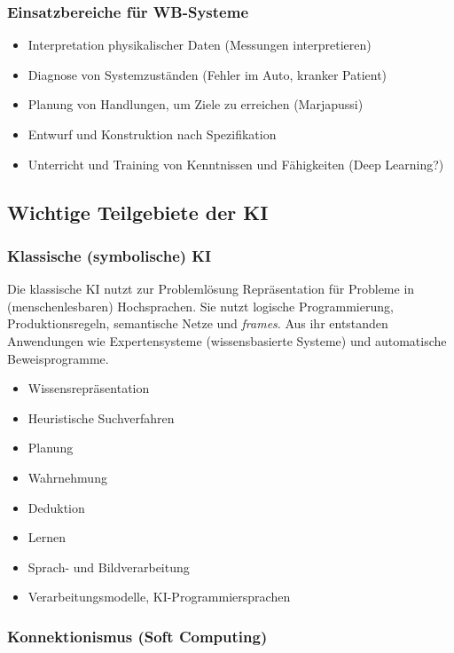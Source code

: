 \documentclass[runningheads,deutsch]{llncs}
\begin{document}
\subsubsection{Einsatzbereiche für WB-Systeme}
\begin{itemize}
    \item Interpretation physikalischer Daten (Messungen interpretieren)
    \item Diagnose von Systemzuständen (Fehler im Auto, kranker Patient)
    \item Planung von Handlungen, um Ziele zu erreichen (Marjapussi)
    \item Entwurf und Konstruktion nach Spezifikation 
    \item Unterricht und Training von Kenntnissen und Fähigkeiten (Deep Learning?)
\end{itemize}

\subsection{Wichtige Teilgebiete der KI}

\subsubsection{Klassische (symbolische) KI}

Die klassische KI nutzt zur Problemlösung Repräsentation für Probleme in (menschenlesbaren) Hochsprachen. Sie nutzt logische Programmierung, Produktionsregeln, semantische Netze und \textit{frames}. Aus ihr entstanden Anwendungen wie Expertensysteme (wissensbasierte Systeme) und automatische Beweisprogramme.

\begin{itemize}
    \item Wissensrepräsentation
    \item Heuristische Suchverfahren
    \item Planung
    \item Wahrnehmung
    \item Deduktion
    \item Lernen
    \item Sprach- und Bildverarbeitung
    \item Verarbeitungsmodelle, KI-Programmiersprachen
\end{itemize}

\subsubsection{Konnektionismus (Soft Computing)}
\end{document}
